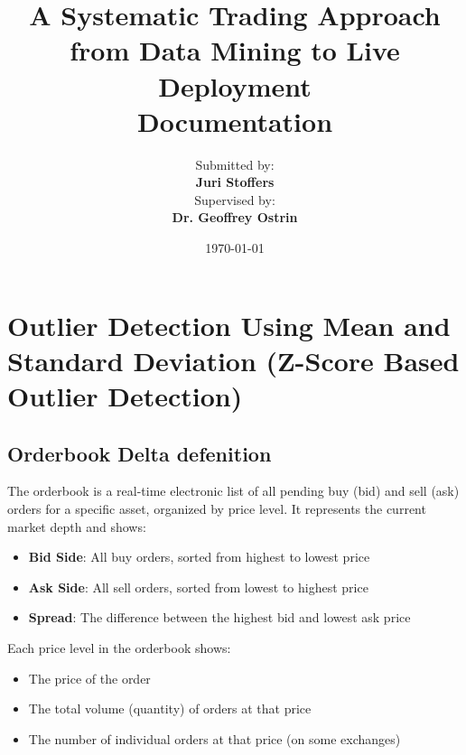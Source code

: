 \documentclass[12pt]{article}
\title{
    \Huge\textbf{A Systematic Trading Approach from Data Mining to Live Deployment}\\
    \vspace{1cm}
    \Large Documentation\\
    \vspace{2cm}
}
\author{
    \Large Submitted by:\\
    \vspace{0.5cm}
    \textbf{Juri Stoffers}\\
    \vspace{2cm}
    \Large Supervised by:\\
    \vspace{0.5cm}
    \textbf{Dr. Geoffrey Ostrin}\\
    \vspace{2cm}
}
\date{\Large \today}
\begin{document}
\begin{titlepage}
\maketitle
\thispagestyle{empty}
\end{titlepage}

\newpage
\null
\thispagestyle{empty}
\newpage


\tableofcontents
\newpage









\newpage


\section{Outlier Detection Using Mean and Standard Deviation (Z-Score Based Outlier Detection)}\label{sec:outlier_detection}


\subsection{Orderbook Delta defenition}
The orderbook is a real-time electronic list of all pending buy (bid) and sell (ask) orders for a specific asset, organized by price level. It represents the current market depth and shows:

\begin{itemize}
  \item \textbf{Bid Side}: All buy orders, sorted from highest to lowest price
  \item \textbf{Ask Side}: All sell orders, sorted from lowest to highest price
  \item \textbf{Spread}: The difference between the highest bid and lowest ask price
\end{itemize}

Each price level in the orderbook shows:
\begin{itemize}
  \item The price of the order
  \item The total volume (quantity) of orders at that price
  \item The number of individual orders at that price (on some exchanges)
\end{itemize}
\end{document}
